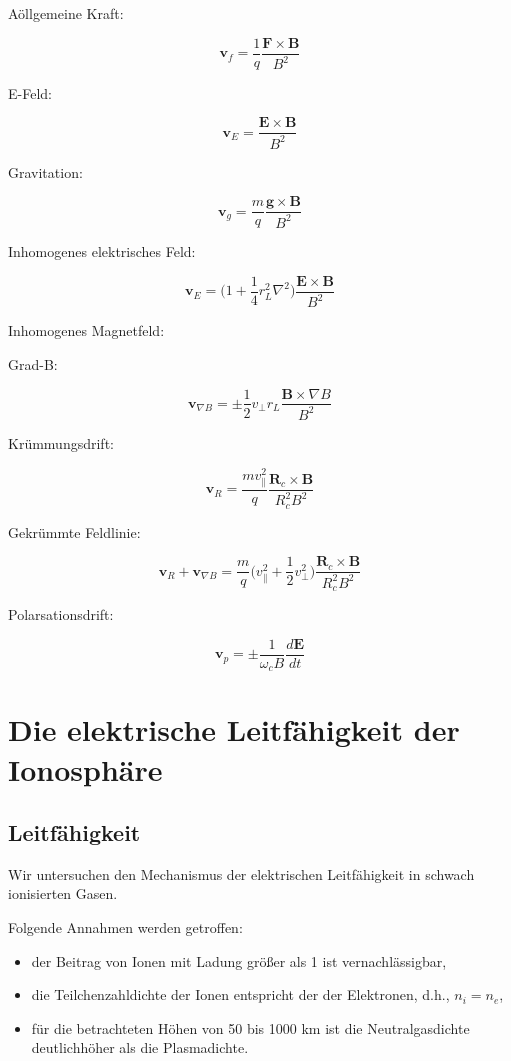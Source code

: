 \documentclass[
  a4paper,
  DIV=11]{scrreprt}
\providecommand{\tightlist}{%
  \setlength{\itemsep}{0pt}\setlength{\parskip}{0pt}}\usepackage{longtable,booktabs,array}
\begin{document}
Aöllgemeine Kraft:

\[
\mathbf{v}_f = \frac{1}{q}\frac{\mathbf{F}\times\mathbf{B}}{B^2}
\]

E-Feld:

\[
\mathbf{v}_E = \frac{\mathbf{E}\times\mathbf{B}}{B^2}
\]

Gravitation:

\[
\mathbf{v}_g = \frac{m}{q}\frac{\mathbf{g}\times\mathbf{B}}{B^2}
\]

Inhomogenes elektrisches Feld:

\[
\mathbf{v}_E = \Big( 1+\frac{1}{4}r_L^2 \nabla^2 \Big)\frac{\mathbf{E}\times\mathbf{B}}{B^2}
\]

Inhomogenes Magnetfeld:

Grad-B:

\[
\mathbf{v}_{\nabla B} = \pm \frac{1}{2}v_\perp r_L\frac{\mathbf{B}\times\nabla B}{B^2}
\]

Krümmungsdrift:

\[
\mathbf{v}_R = \frac{mv_\parallel^2}{q}\frac{\mathbf{R}_c \times\mathbf{B}}{R_c^2 B^2}
\]

Gekrümmte Feldlinie:

\[
\mathbf{v}_R + \mathbf{v}_{\nabla B} = \frac{m}{q}\Big( v_\parallel^2 + \frac{1}{2}v_\perp^2 \Big) \frac{\mathbf{R}_c \times\mathbf{B}}{R_c^2 B^2}
\]

Polarsationsdrift:

\[
\mathbf{v}_p = \pm \frac{1}{\omega_c B}\frac{d\mathbf{E}}{dt}
\]

\part{Die elektrische Leitfähigkeit der Ionosphäre}

\hypertarget{leitfuxe4higkeit}{%
\chapter{Leitfähigkeit}\label{leitfuxe4higkeit}}

Wir untersuchen den Mechanismus der elektrischen Leitfähigkeit in
schwach ionisierten Gasen.

Folgende Annahmen werden getroffen:

\begin{itemize}
\tightlist
\item
  der Beitrag von Ionen mit Ladung größer als 1 ist vernachlässigbar,
\item
  die Teilchenzahldichte der Ionen entspricht der der Elektronen, d.h.,
  \(n_i = n_e\),
\item
  für die betrachteten Höhen von 50 bis 1000 km ist die Neutralgasdichte
  deutlichhöher als die Plasmadichte.
\end{itemize}
\end{document}
